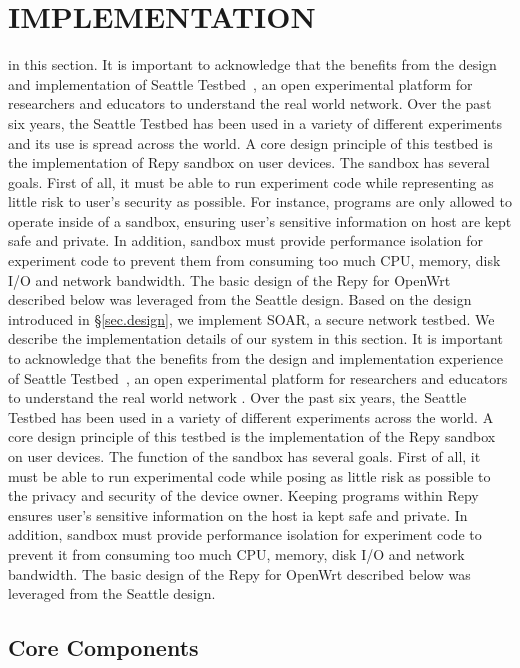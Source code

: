 \chapter{IMPLEMENTATION}
\label{sec.implementation}
in this section. It is important to acknowledge that the \sysname benefits from the design and implementation of Seattle Testbed~\cite{cappos2009seattle}, an open experimental platform for researchers and educators to understand the real world network. Over the past six years, the Seattle Testbed has been used in a variety of different experiments and its use is spread across the world. A core design principle of this testbed is the implementation of Repy sandbox on user devices. The sandbox has several goals. First of all, it must be able to run experiment code while representing as little risk to user's security as possible. For instance, programs are only allowed to operate inside of a sandbox, ensuring user's sensitive information on host are kept safe and private. In addition, sandbox must provide performance isolation for experiment code to prevent them from consuming too much CPU, memory, disk I/O and network bandwidth. The basic design of the Repy for OpenWrt described below was leveraged from the Seattle design.
Based on the design introduced in \S{\ref{sec.design}}, we implement SOAR, a
secure network testbed. We describe the implementation details of our system
in this section. It is important to acknowledge that the \sysname benefits from
the design and implementation experience of Seattle Testbed~\cite{cappos2009seattle},
 an open experimental platform for researchers and educators to understand the
real world network .
Over the past six years,
the Seattle Testbed has been used in a variety of different experiments across
the world. A core design principle of this testbed is the implementation of the
Repy sandbox on user devices. The function of the sandbox has several goals.
First of all, it must be able to run experimental code while posing as
little risk as possible to the privacy and security of the device owner.
Keeping programs within Repy
ensures user's sensitive information on the host ia kept safe and private.
In addition, sandbox must provide performance isolation for experiment code to
 prevent it from consuming too much CPU, memory, disk I/O and network bandwidth.
  The basic design of the Repy for OpenWrt described below was leveraged from the Seattle design.

\section{Core Components}
